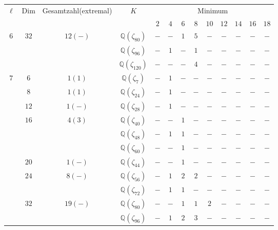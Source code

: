 \documentclass[12pt,a4paper,halfparskip,headsepline,bibtotocnumbered]{scrreprt}
\theoremstyle{nummermitklammern}
\theoremstyle{nonumberbreak}
\newcommand{\Q}{\mathbb{Q}}
\begin{document}
\begin{table}
	\centering
	\begin{tabular}{|c|c|c|c|c|c|c|c|c|c|c|c|c|}
		\hline		
		\multirow{2}{*}{$\ell$}	&\multirow{2}{*}{Dim}	&\multirow{2}{*}{Gesamtzahl(extremal)}	&\multirow{2}{*}{$K$}	&\multicolumn{9}{c|}{Minimum}\\ \cline{5-13}
								&						&							&					&$2$	&$4$	&$6$	&$8$	&$10$	&$12$	&$14$	&$16$	&$18$\\ \hline
		\multirow{3}{*}{$6$}	&\multirow{3}{*}{$32$}	&\multirow{3}{*}{$12(-)$}	&$\Q(\zeta_{80})$	&$-$	&$-$	&$1$	&$5$	&$-$	&$-$	&$-$	&$-$	&$-$\\ \cline{4-13}
								&						&							&$\Q(\zeta_{96})$	&$-$	&$1$	&$-$	&$1$	&$-$	&$-$	&$-$	&$-$	&$-$\\ \cline{4-13}
								&						&							&$\Q(\zeta_{120})$	&$-$	&$-$	&$-$	&$4$	&$-$	&$-$	&$-$	&$-$	&$-$\\ \hline
		\multirow{12}{*}{$7$}	&$6$					&$1(1)$						&$\Q(\zeta_{7})$	&$-$	&$1$	&$-$	&$-$	&$-$	&$-$	&$-$	&$-$	&$-$\\ \cline{2-13}
								&$8$					&$1(1)$						&$\Q(\zeta_{24})$	&$-$	&$1$	&$-$	&$-$	&$-$	&$-$	&$-$	&$-$	&$-$\\ \cline{2-13}
								&$12$					&$1(-)$						&$\Q(\zeta_{28})$	&$-$	&$1$	&$-$	&$-$	&$-$	&$-$	&$-$	&$-$	&$-$\\ \cline{2-13}
								&\multirow{3}{*}{$16$}	&\multirow{3}{*}{$4(3)$}	&$\Q(\zeta_{40})$	&$-$	&$-$	&$1$	&$-$	&$-$	&$-$	&$-$	&$-$	&$-$\\ \cline{4-13}
								&						&							&$\Q(\zeta_{48})$	&$-$	&$1$	&$1$	&$-$	&$-$	&$-$	&$-$	&$-$	&$-$\\ \cline{4-13}
								&						&							&$\Q(\zeta_{60})$	&$-$	&$-$	&$1$	&$-$	&$-$	&$-$	&$-$	&$-$	&$-$\\ \cline{2-13}
								&$20$					&$1(-)$						&$\Q(\zeta_{44})$	&$-$	&$-$	&$1$	&$-$	&$-$	&$-$	&$-$	&$-$	&$-$\\ \cline{2-13}
								&\multirow{2}{*}{$24$}	&\multirow{2}{*}{$8(-)$}	&$\Q(\zeta_{56})$	&$-$	&$1$	&$2$	&$2$	&$-$	&$-$	&$-$	&$-$	&$-$\\ \cline{4-13}
								&						&							&$\Q(\zeta_{72})$	&$-$	&$1$	&$1$	&$-$	&$-$	&$-$	&$-$	&$-$	&$-$\\ \cline{2-13}
								&\multirow{3}{*}{$32$}	&\multirow{3}{*}{$19(-)$}	&$\Q(\zeta_{80})$	&$-$	&$-$	&$1$	&$1$	&$2$	&$-$	&$-$	&$-$	&$-$\\ \cline{4-13}
								&						&							&$\Q(\zeta_{96})$	&$-$	&$1$	&$2$	&$3$	&$-$	&$-$	&$-$	&$-$	&$-$\\ \cline{4-13}

\end{tabular}
\end{table}
\end{document}
